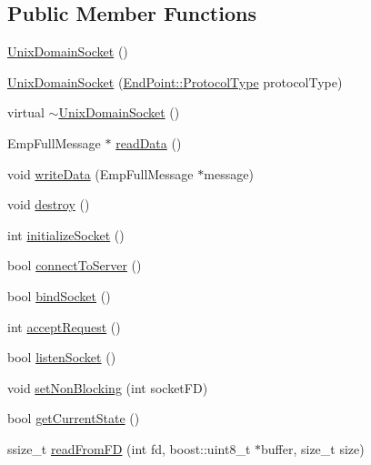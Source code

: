 \subsection*{Public Member Functions}
\begin{DoxyCompactItemize}
\item 
\hyperlink{classipc_1_1UnixDomainSocket_a9d87b6cfaa62cf9fa8d64ed533001753}{Unix\+Domain\+Socket} ()
\item 
\hyperlink{classipc_1_1UnixDomainSocket_a10ab8e00efe147e7f313a1298113244a}{Unix\+Domain\+Socket} (\hyperlink{classipc_1_1EndPoint_adcdf30d3a61d3d342529b1fb8b0bbd72}{End\+Point\+::\+Protocol\+Type} protocol\+Type)
\item 
virtual \hyperlink{classipc_1_1UnixDomainSocket_a77a7af339ff0c934d90586d124244e7b}{$\sim$\+Unix\+Domain\+Socket} ()
\item 
Emp\+Full\+Message $\ast$ \hyperlink{classipc_1_1UnixDomainSocket_a694233d63430495b4ecbc5c5b59c01e4}{read\+Data} ()
\item 
void \hyperlink{classipc_1_1UnixDomainSocket_aff0368529a5eebb701e4689213880a97}{write\+Data} (Emp\+Full\+Message $\ast$message)
\item 
void \hyperlink{classipc_1_1UnixDomainSocket_ae8e7915608903f74300a9f626bdb3d3f}{destroy} ()
\item 
int \hyperlink{classipc_1_1UnixDomainSocket_ae1d8cecdd27269a77969b128e2f70774}{initialize\+Socket} ()
\item 
bool \hyperlink{classipc_1_1UnixDomainSocket_acaf4e80b5d2e0069c0347cb7ad69b279}{connect\+To\+Server} ()
\item 
bool \hyperlink{classipc_1_1UnixDomainSocket_a5dddd0aef5c2184843f573c19156ba37}{bind\+Socket} ()
\item 
int \hyperlink{classipc_1_1UnixDomainSocket_a381d1f377da1a980bddfde2abb577bf0}{accept\+Request} ()
\item 
bool \hyperlink{classipc_1_1UnixDomainSocket_a2887b754b2b26b7c4c947aa27a8a75c8}{listen\+Socket} ()
\item 
void \hyperlink{classipc_1_1UnixDomainSocket_abbb0ec8d20157b203eee0eabcda81ec9}{set\+Non\+Blocking} (int socket\+FD)
\item 
bool \hyperlink{classipc_1_1UnixDomainSocket_a7fc2dceda50345568051d849c1c396dd}{get\+Current\+State} ()
\item 
ssize\+\_\+t \hyperlink{classipc_1_1UnixDomainSocket_aa3495bc1d20aaf30d80c14b3fb85f35c}{read\+From\+FD} (int fd, boost\+::uint8\+\_\+t $\ast$buffer, size\+\_\+t size)
\end{DoxyCompactItemize}
